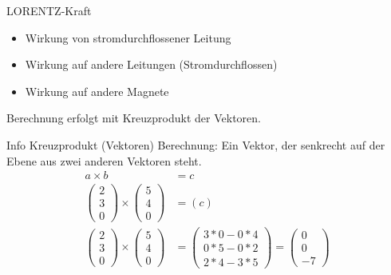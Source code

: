 \begin{frame}{LORENTZ-Kraft}
\begin{itemize}
 \item Wirkung von stromdurchflossener Leitung
 \item Wirkung auf andere Leitungen (Stromdurchflossen)
 \item Wirkung auf andere Magnete
\end{itemize}
Berechnung erfolgt mit Kreuzprodukt der Vektoren.
\end{frame}

\begin{frame}{Info Kreuzprodukt (Vektoren)}
 Berechnung: Ein Vektor, der senkrecht auf der Ebene aus zwei anderen Vektoren steht.
 \begin{align}
 a\times b &= c \\
 \left(
 \begin{array}{c}
 2\\3\\0
 \end{array}
 \right)\times
  \left(
 \begin{array}{c}
 5\\4\\0
 \end{array}
 \right) &=
 (c)\\
  \left(
 \begin{array}{c}
 2\\3\\0
 \end{array}
 \right)\times
  \left(
 \begin{array}{c}
 5\\4\\0
 \end{array}
 \right) &=
 \left(
 \begin{array}{c}
  3*0-0*4\\
  0*5-0*2\\
  2*4-3*5
 \end{array}
 \right)=
 \left(
 \begin{array}{c}
  0\\
  0\\
  -7
 \end{array}
 \right)
 \end{align}
\end{frame}


